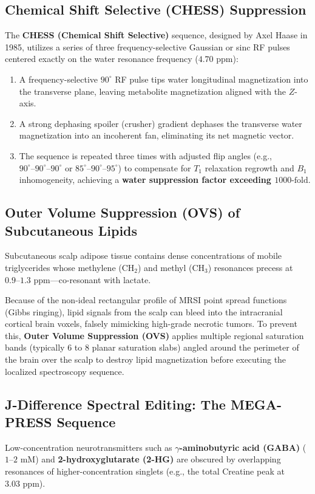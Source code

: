 \documentclass[11pt,a4paper]{article}
\begin{document}
\subsection{Chemical Shift Selective (CHESS) Suppression}
The \textbf{CHESS (Chemical Shift Selective)} sequence, designed by Axel Haase in 1985, utilizes a series of three frequency-selective Gaussian or sinc RF pulses centered exactly on the water resonance frequency ($4.70\text{ ppm}$):
\begin{enumerate}
    \item A frequency-selective $90^\circ$ RF pulse tips water longitudinal magnetization into the transverse plane, leaving metabolite magnetization aligned with the $Z$-axis.
    \item A strong dephasing spoiler (crusher) gradient dephases the transverse water magnetization into an incoherent fan, eliminating its net magnetic vector.
    \item The sequence is repeated three times with adjusted flip angles (e.g., $90^\circ\text{--}90^\circ\text{--}90^\circ$ or $85^\circ\text{--}90^\circ\text{--}95^\circ$) to compensate for $T_1$ relaxation regrowth and $B_1$ inhomogeneity, achieving a \textbf{water suppression factor exceeding $1000\text{-fold}$}.
\end{enumerate}

\subsection{Outer Volume Suppression (OVS) of Subcutaneous Lipids}
Subcutaneous scalp adipose tissue contains dense concentrations of mobile triglycerides whose methylene ($\text{CH}_2$) and methyl ($\text{CH}_3$) resonances precess at $0.9\text{--}1.3\text{ ppm}$---co-resonant with lactate. 

Because of the non-ideal rectangular profile of MRSI point spread functions (Gibbs ringing), lipid signals from the scalp can bleed into the intracranial cortical brain voxels, falsely mimicking high-grade necrotic tumors. To prevent this, \textbf{Outer Volume Suppression (OVS)} applies multiple regional saturation bands (typically 6 to 8 planar saturation slabs) angled around the perimeter of the brain over the scalp to destroy lipid magnetization before executing the localized spectroscopy sequence.

\subsection{J-Difference Spectral Editing: The MEGA-PRESS Sequence}
Low-concentration neurotransmitters such as \textbf{$\gamma$-aminobutyric acid (GABA)} ($1\text{--}2\text{ mM}$) and \textbf{2-hydroxyglutarate (2-HG)} are obscured by overlapping resonances of higher-concentration singlets (e.g., the total Creatine peak at $3.03\text{ ppm}$).
\end{document}
